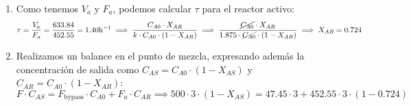 \begin{enumerate}
    \item Como tenemos $V_a$ y $F_a$, podemos calcular $\tau$ para el reactor activo:
          \begin{equation}
              \tau = \frac{V_a}{F_a} = \frac{633.84}{452.55} = 1.40 \si{h^{-1}} \implies \frac{C_{A0}\cdot X_{AR}}{k \cdot C_{A0}\cdot (1-X_{AR})} \implies\frac{\cancel{C_{A0}}\cdot X_{AR}}{1.875 \cdot {\cancel{C_{A0}}\cdot (1-X_{AR})}} \implies X_{AR}= 0.724
          \end{equation}
    \item Realizamos un balance en el punto de mezcla, expresando además la concentración de salida como $C_{AS} = C_{A0}\cdot (1-X_{AS})$ y $C_{AR} = C_{A0}\cdot (1-X_{AR})$:
          \begin{equation}
              F \cdot C_{AS} = F_{\text{bypass}}\cdot C_{A0} + F_a \cdot C_{AR} \implies 500 \cdot  3 \cdot (1-X_{AS}) = 47.45 \cdot 3 + 452.55 \cdot 3 \cdot (1-0.724)
          \end{equation}
\end{enumerate}
\begin{center}
\end{center}
